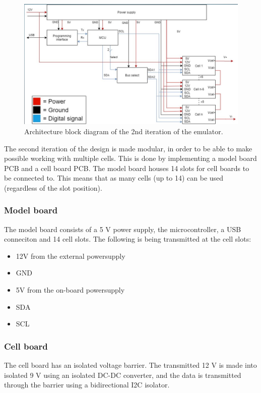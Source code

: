 \begin{figure}[h]
    \centering
    \includegraphics[scale=0.5]{architecture_2nd_iteration.png}
    \caption{Architecture block diagram of the 2nd iteration of the emulator.}
\end{figure}

The second iteration of the design is made modular, in order to be able to make 
possible working with multiple cells. This is done by implementing a model board
PCB and a cell board PCB. The model board houses 14 slots for cell boards to be 
connected to. This means that as many cells (up to 14) can be used (regardless 
of the slot position).

    \subsubsection{Model board}
    The model board consists of a 5 V power supply, the microcontroller, a USB 
    conneciton and 14 cell slots. The following is being transmitted at the
    cell slots:

    \begin{itemize}
        \item 12V from the external powersupply
        \item GND
        \item 5V from the on-board powersupply
        \item SDA
        \item SCL
    \end{itemize}

    \subsubsection{Cell board}
    The cell board has an isolated voltage barrier. The transmitted 12 V is 
    made into isolated 9 V using an isolated DC-DC converter, and the data is
    transmitted through the barrier using a bidirectional I2C isolator.

